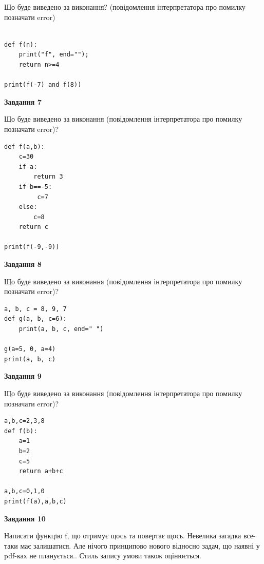 \documentclass[12pt, ukrainian]{article}
\begin{document}
{\begin {large}
Що буде виведено за виконання? (повідомлення інтерпретатора про помилку позначати error)\par
\begin{verbatim}

def f(n):
    print("f", end="");
    return n>=4

print(f(-7) and f(8))
\end{verbatim}

{\begin {center}\textbf{Завдання 7}\end {center}}

Що буде виведено за виконання (повідомлення інтерпретатора про помилку позначати error)?\par
\begin{verbatim}
def f(a,b):
    c=30
    if a:
        return 3
    if b==-5:
         c=7
    else: 
        c=8
    return c

print(f(-9,-9))
\end{verbatim}

{\begin {center}\textbf{Завдання 8}\end {center}}

Що буде виведено за виконання (повідомлення інтерпретатора про помилку позначати error)?\par
\begin{verbatim}
a, b, c = 8, 9, 7
def g(a, b, c=6):
    print(a, b, c, end=" ")

g(a=5, 0, a=4)
print(a, b, c)
\end{verbatim}

{\begin {center}\textbf{Завдання 9}\end {center}}

Що буде виведено за виконання (повідомлення інтерпретатора про помилку позначати error)?\par
\begin{verbatim}
a,b,c=2,3,8
def f(b):
    a=1
    b=2
    c=5
    return a+b+c

a,b,c=0,1,0
print(f(a),a,b,c)
\end{verbatim}

{\begin {center}\textbf{Завдання 10}\end {center}}


Написати функцiю f, що отримує щось та повертає щось. Невелика загадка все-таки має залишатися. Але нічого принципово нового відносно задач, що наявні у pdf-ках не планується.. Стиль запису умови також оцінюється.\par
\end {large}}
\newpage
\end{document}

